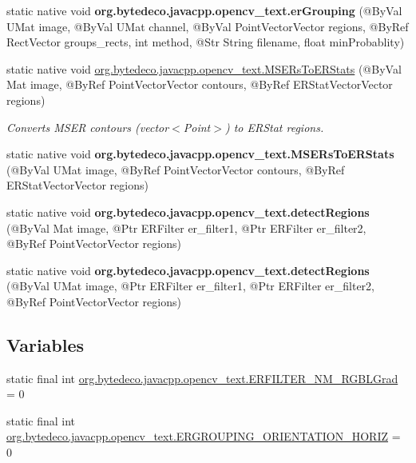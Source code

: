 \begin{DoxyCompactItemize}
\item 
\mbox{\label{group__text__detect_ga5e8cf9156f672403885fcc631f91870c}} 
static native void {\bfseries org.\+bytedeco.\+javacpp.\+opencv\+\_\+text.\+er\+Grouping} (@By\+Val U\+Mat image, @By\+Val U\+Mat channel, @By\+Val Point\+Vector\+Vector regions, @By\+Ref Rect\+Vector groups\+\_\+rects, int method, @Str String filename, float min\+Probablity)
\item 
static native void \hyperlink{group__text__detect_gad4c72b60ca712eeab78c52b946f649a2}{org.\+bytedeco.\+javacpp.\+opencv\+\_\+text.\+M\+S\+E\+Rs\+To\+E\+R\+Stats} (@By\+Val Mat image, @By\+Ref Point\+Vector\+Vector contours, @By\+Ref E\+R\+Stat\+Vector\+Vector regions)
\begin{DoxyCompactList}\small\item\em Converts M\+S\+ER contours (vector$<$Point$>$) to E\+R\+Stat regions. \end{DoxyCompactList}\item 
\mbox{\label{group__text__detect_ga1188e2750096a4f93afad0c0cf931762}} 
static native void {\bfseries org.\+bytedeco.\+javacpp.\+opencv\+\_\+text.\+M\+S\+E\+Rs\+To\+E\+R\+Stats} (@By\+Val U\+Mat image, @By\+Ref Point\+Vector\+Vector contours, @By\+Ref E\+R\+Stat\+Vector\+Vector regions)
\item 
\mbox{\label{group__text__detect_ga82e531b1f0fa6fd05234127fd1b43005}} 
static native void {\bfseries org.\+bytedeco.\+javacpp.\+opencv\+\_\+text.\+detect\+Regions} (@By\+Val Mat image, @Ptr E\+R\+Filter er\+\_\+filter1, @Ptr E\+R\+Filter er\+\_\+filter2, @By\+Ref Point\+Vector\+Vector regions)
\item 
\mbox{\label{group__text__detect_ga87f7f3a3bb00c8f7d14a61b3873d8dbc}} 
static native void {\bfseries org.\+bytedeco.\+javacpp.\+opencv\+\_\+text.\+detect\+Regions} (@By\+Val U\+Mat image, @Ptr E\+R\+Filter er\+\_\+filter1, @Ptr E\+R\+Filter er\+\_\+filter2, @By\+Ref Point\+Vector\+Vector regions)
\end{DoxyCompactItemize}
\subsection*{Variables}
\begin{DoxyCompactItemize}
\item 
static final int \hyperlink{group__text__detect_gad0d3e0c8791f14093e736cd2da75632d}{org.\+bytedeco.\+javacpp.\+opencv\+\_\+text.\+E\+R\+F\+I\+L\+T\+E\+R\+\_\+\+N\+M\+\_\+\+R\+G\+B\+L\+Grad} = 0
\item 
static final int \hyperlink{group__text__detect_gab646588b9db6ae1e1aae89cc09ea4059}{org.\+bytedeco.\+javacpp.\+opencv\+\_\+text.\+E\+R\+G\+R\+O\+U\+P\+I\+N\+G\+\_\+\+O\+R\+I\+E\+N\+T\+A\+T\+I\+O\+N\+\_\+\+H\+O\+R\+IZ} = 0
\end{DoxyCompactItemize}


